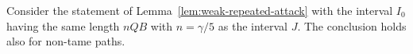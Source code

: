 \documentclass[11pt]{memoir}
\theoremstyle{definition} %
\def\B{B}
\newcommand{\Q}{Q} %
\begin{document}

\begin{lemma}\label{lem:repeated-attack}
  Consider the statement of Lemma~\ref{lem:weak-repeated-attack} with the interval
  \( I_{0} \) having the same length \( n\Q\B \) with \( n=\gamma/5 \) as the interval \( J \).
  The conclusion holds also for non-tame paths.
\end{lemma}
\end{document}
